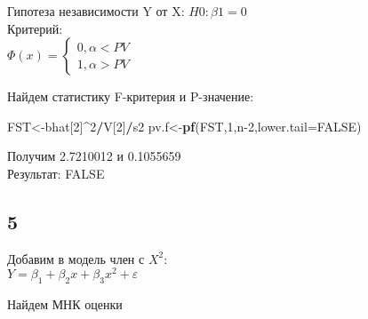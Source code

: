 \documentclass[]{article}
\newenvironment{Shaded}{\begin{snugshade}}{\end{snugshade}}
\newcommand{\DataTypeTok}[1]{\textcolor[rgb]{0.13,0.29,0.53}{#1}}
\newcommand{\DecValTok}[1]{\textcolor[rgb]{0.00,0.00,0.81}{#1}}
\newcommand{\KeywordTok}[1]{\textcolor[rgb]{0.13,0.29,0.53}{\textbf{#1}}}
\newcommand{\NormalTok}[1]{#1}
\newcommand{\OperatorTok}[1]{\textcolor[rgb]{0.81,0.36,0.00}{\textbf{#1}}}
\newcommand{\OtherTok}[1]{\textcolor[rgb]{0.56,0.35,0.01}{#1}}
\newcommand{\StringTok}[1]{\textcolor[rgb]{0.31,0.60,0.02}{#1}}
\begin{document}
Гипотеза независимости Y от X: \(H0: \beta1=0\)\\
Критерий:\\
\(\Phi(x)=\begin{cases} 0, \alpha<PV \\ 1,\alpha>PV \end{cases}\)

Найдем статистику F-критерия и P-значение:

\begin{Shaded}
\begin{Highlighting}[]
\NormalTok{FST<-bhat[}\DecValTok{2}\NormalTok{]}\OperatorTok{^}\DecValTok{2}\OperatorTok{/}\NormalTok{V[}\DecValTok{2}\NormalTok{]}\OperatorTok{/}\NormalTok{s2}
\NormalTok{pv.f<-}\KeywordTok{pf}\NormalTok{(FST,}\DecValTok{1}\NormalTok{,n}\DecValTok{-2}\NormalTok{,}\DataTypeTok{lower.tail=}\OtherTok{FALSE}\NormalTok{)}
\end{Highlighting}
\end{Shaded}

Получим 2.7210012 и 0.1055659\\
Результат: FALSE

\hypertarget{section-4}{%
\subsection{5}\label{section-4}}

Добавим в модель член с \(X^2\):\\
\(Y=\beta_1+\beta_2x+\beta_3x^2+\varepsilon\)

Найдем МНК оценки

\begin{Shaded}
\end{Shaded}
\end{document}
